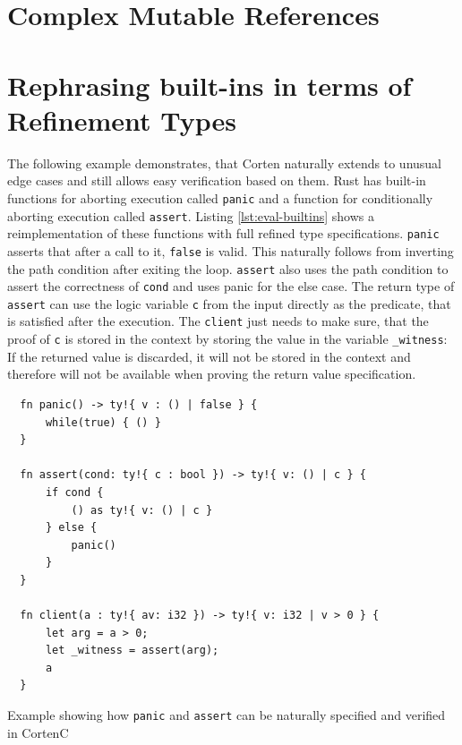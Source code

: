 \documentclass{book}
\newcommand{\code}[1]{\texttt{#1}}
\theoremstyle{definition}
\begin{document}
\label{subsec:evaluation-complex-mutable-ref}\section{Complex Mutable References}



\section{Rephrasing built-ins in terms of Refinement Types}

The following example demonstrates, that Corten naturally extends to unusual edge cases and still allows easy verification based on them.
Rust has built-in functions for aborting execution \- called \code{panic} \- and a function for conditionally aborting execution \- called \code{assert}. Listing \ref{lst:eval-builtins} shows a reimplementation of these functions with full refined type specifications. 
\code{panic} asserts that after a call to it, \code{false} is valid. This naturally follows from inverting the path condition after exiting the loop. 
\code{assert} also uses the path condition to assert the correctness of \code{cond} and uses panic for the else case. The return type of \code{assert} can use the logic variable \code{c} from the input directly as the predicate, that is satisfied after the execution.
The \code{client} just needs to make sure, that the proof of \code{c} is stored in the context by storing the value in the variable \code{\_witness}: If the returned value is discarded, it will not be stored in the context and therefore will not be available when proving the return value specification.


\begin{listing}[h]
  \begin{verbatim}
  fn panic() -> ty!{ v : () | false } {
      while(true) { () }
  }

  fn assert(cond: ty!{ c : bool }) -> ty!{ v: () | c } {
      if cond {
          () as ty!{ v: () | c }
      } else {
          panic()
      }
  }

  fn client(a : ty!{ av: i32 }) -> ty!{ v: i32 | v > 0 } {
      let arg = a > 0;
      let _witness = assert(arg);
      a
  }
  \end{verbatim}
  \caption{Example showing how \code{panic} and \code{assert} can be naturally specified and verified in CortenC}
  \label{lst:eval-builtins}
\end{listing}
\end{document}
